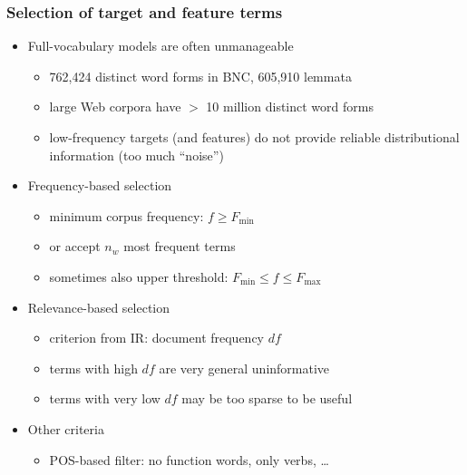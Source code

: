 \documentclass[t]{beamer} %
\begin{document}
\begin{frame}
  \frametitle{Selection of target and feature terms}
  
  \begin{itemize}
  \item Full-vocabulary models are often unmanageable
    \begin{itemize}
    \item 762,424 distinct word forms in BNC, 605,910 lemmata
    \item large Web corpora have $>$ 10 million distinct word forms
    \item low-frequency targets (and features) do not provide reliable distributional information (too much ``noise'')
    \end{itemize}
  \item<2-> Frequency-based selection
    \begin{itemize}
    \item minimum corpus frequency: $f \geq F_{\min}$
    \item or accept $n_w$ most frequent terms
    \item sometimes also upper threshold: $F_{\min}\leq f\leq F_{\max}$
    \end{itemize}
  \item<3-> Relevance-based selection
    \begin{itemize}
    \item criterion from IR: document frequency $df$
    \item terms with high $df$ are very general \so uninformative
    \item terms with very low $df$ may be too sparse to be useful
    \end{itemize}
  \item<4-> Other criteria
    \begin{itemize}
    \item POS-based filter: no function words, only verbs, \ldots
    \end{itemize}
  \end{itemize}
\end{frame}

\end{document}
